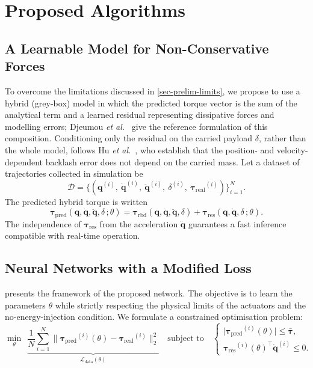 \documentclass[a4paper, oneside]{article}
\newcommand{\q}{\ensuremath{\boldsymbol{q}}}
\newcommand{\qd}{\ensuremath{\boldsymbol{\dot{q}}}}
\newcommand{\qdd}{\ensuremath{\boldsymbol{\ddot{q}}}}
\newcommand{\taurbd}{\ensuremath{\boldsymbol{\tau}_{\mathrm{rbd}}}}
\newcommand{\taures}{\ensuremath{\boldsymbol{\tau}_{\mathrm{res}}}}
\newcommand{\taupred}{\ensuremath{\boldsymbol{\tau}_{\mathrm{pred}}}}
\newcommand{\taureal}{\ensuremath{\boldsymbol{\tau}_{\mathrm{real}}}}
\newcommand{\Dset}{\ensuremath{\mathcal{D}}}
\begin{document}
\section{Proposed Algorithms}
\label{sec-algorithmes}

\subsection{A Learnable Model for Non-Conservative Forces}
\label{sec-algo-modele}

To overcome the limitations discussed in \cref{sec-prelim-limits}, we propose to use a hybrid (grey-box) model in which the predicted torque vector is the sum of the analytical term and a learned residual representing dissipative forces and modelling errors; Djeumou \emph{et al.}~\cite{djeumou2022} give the reference formulation of this composition. Conditioning only the residual on the carried payload $\delta$, rather than the whole model, follows Hu \emph{et al.}~\cite{hu2026}, who establish that the position- and velocity-dependent backlash error does not depend on the carried mass. Let a dataset of trajectories collected in simulation be
%
\begin{equation}
    \Dset = \bigl\{ (\q^{(i)},\ \qd^{(i)},\ \qdd^{(i)},\ \delta^{(i)},\ \taureal^{(i)}) \bigr\}_{i=1}^{N} .
    \label{eq-dataset}
\end{equation}
%
The predicted hybrid torque is written
%
\begin{equation}
    \taupred(\q,\qd,\qdd,\delta\,;\theta) = \taurbd(\q,\qd,\qdd,\delta) + \taures(\q,\qd,\delta\,;\theta) .
    \label{eq-modele}
\end{equation}
%
The independence of $\taures$ from the acceleration $\qdd$ guarantees a fast inference compatible with real-time operation.

\subsection{Neural Networks with a Modified Loss}
\label{sec-algo-loss}

 presents the framework of the proposed network. The objective is to learn the parameters $\theta$ while strictly respecting the physical limits of the actuators and the no-energy-injection condition. We formulate a constrained optimisation problem:
%
\begin{equation}
    \min_{\theta}\ \
    \underbrace{\frac{1}{N}\sum_{i=1}^{N}
    \bigl\| \taupred^{(i)}(\theta) - \taureal^{(i)} \bigr\|_{2}^{2}}
    _{\mathcal{L}_{\mathrm{data}}(\theta)}
    \quad \text{subject to} \quad
    \begin{cases}
        \bigl|\taupred^{(i)}(\theta)\bigr| \le \bar{\boldsymbol{\tau}} , \\[2pt]
        \taures^{(i)}(\theta)^{\top} \qd^{(i)} \le 0 .
    \end{cases}
    \label{eq-probleme}
\end{equation}
\end{document}
